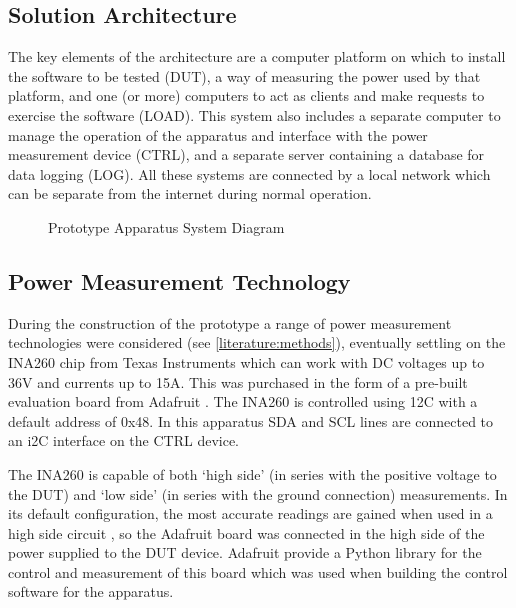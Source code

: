 \subsection{Solution Architecture}

The key elements of the architecture are a computer platform on which to install the software to be tested (DUT), a way of measuring the power used by that platform, and one (or more) computers to act as clients and make requests to exercise the software (LOAD). This system also includes a separate computer to manage the operation of the apparatus and interface with the power measurement device (CTRL), and a separate server containing a database for data logging (LOG). All these systems are connected by a local network which can be separate from the internet during normal operation.

\begin{figure}[htbp]
  \centering
  
  \caption{Prototype Apparatus System Diagram}
\end{figure}

\subsection{Power Measurement Technology}
\label{Power measurement}

During the construction of the prototype a range of power measurement technologies were considered (see \autoref{literature:methods}), eventually settling on the INA260 chip from Texas Instruments \citep{TexasInstruments2016} which can work with DC voltages up to 36V and currents up to 15A. This was purchased in the form of a pre-built evaluation board from Adafruit \citep{AdafruitINA260}. The INA260 is controlled using 12C with a default address of 0x48. In this apparatus SDA and SCL lines are connected to an i2C interface on the CTRL device.

The INA260 is capable of both `high side' (in series with the positive voltage to the DUT) and `low side' (in series with the ground connection) measurements. In its  default configuration, the most accurate readings are gained when used in a high side circuit \citep{TexasInstruments2016}, so the Adafruit board was connected in the high side of the power supplied to the DUT device. Adafruit provide a Python library for the control and measurement of this board which was used when building the control software for the apparatus.

